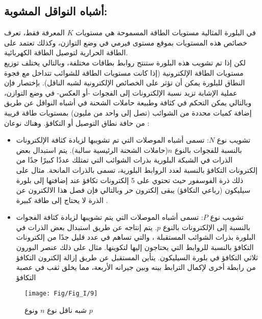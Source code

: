 \subsection{أشباه النواقل المشوبة:}
في البلورة المثالية مستويات الطاقة المسموحة هي مستويات $ K $ المعرفة فقط، تعرف خصائص هذه المستويات بموقع مستوى فيرمي في وضع التوازن، وكذلك تعتمد على الطاقة الحرارية لتوصيل الطاقة الكهربائية.
\\
لكن إذا تم تشويب هذه البلورة ستنتج روابط بطاقات مختلفة، وبالتالي يختلف توزيع مستويات الطاقة الإلكترونية (إذا كانت مستويات الطاقة للشوائب تتداخل مع فجوة النطاق للبلورة يمكن أن تؤثر على الخصائص الإلكترونية لشبه الناقل). بإختصار فإن عملية الإشابة تزيد نسبة الإلكترونات إلى الفجوات -أو العكس- في وضع التوازن، وبالتالي يمكن التحكم في كثافة وطبيعة حاملات الشحنة في أشباه النواقل عن طريق إضافة كميات محددة من الشوائب (تصل إلى واحد من مليون)  بمستويات طاقة قريبة من حافة نطاق التوصيل أو التكافؤ. وهناك نوعان :
\begin{itemize}
	\item تشويب نوع $ N $: 
	تسمى أشباه الموصلات التي تم تشويبها لزيادة كثافة الإلكترونات بالنسبة للفجوات بالنوع $ n $(حاملات الشحنة الرئيسية سالبة). يتم  استبدال بعض الذرات في الشبكة البلورية بذرات الشوائب التي تمتلك عددًا كبيرًا جدًا من إلكترونات التكافؤ بالنسبة لعدد الروابط البلورية، تسمى بالذرات المانحة. مثال على ذلك ذرة الفوسفور حيث تحتوي على 5 إلكترونات تكافؤ عند إضافتها إلى بلورة سيليكون (رباعي التكافؤ) يبقى إلكترون حر وبالتالي فإن فصل هذا الالكترون عن الذرة لا يحتاج إلى طاقة كبيرة . 
	
	\item تشويب نوع $ P $: 
	تسمى أشباه الموصلات التي يتم تشويبها لزيادة كثافة الفجوات بالنسبة إلى الإلكترونات بالنوع $ p $. يتم إنتاجه عن طريق استبدال بعض الذرات في البلورة بذرات الشوائب المستقبلة ، والتي تساهم في عدد قليل جدًا من إلكترونات التكافؤ بالنسبة للروابط التي يحتاجون إليها لتكوينها. مثال على ذلك عنصر البورون ثلاثي التكافؤ في بلورة  السيليكون. يتأين المستقبل عن طريق إزالة إلكترون التكافؤ من رابطة أخرى لإكمال الترابط بينه وبين جيرانه الأربعة، مما يخلق ثقب في عصبة التكافؤ
\end{itemize}
	\begin{figure}[h!]
		\centering
		\texttt{[image: Fig/Fig\_I/9]}
		\caption{شبه ناقل نوع $ n $ ونوع $ p $}
		\label{fig:9}
	\end{figure}
	\FloatBarrier
